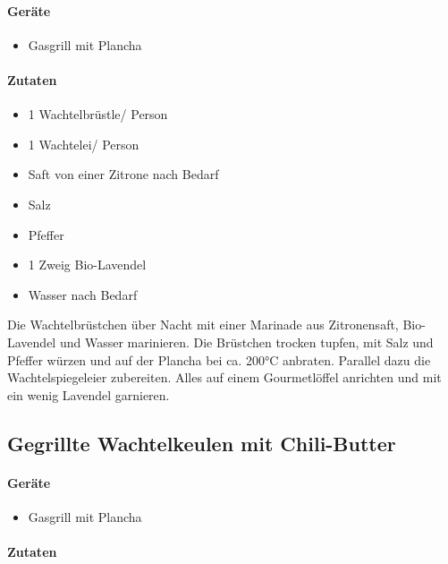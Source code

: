 \paragraph{Geräte}

\begin{itemize}[noitemsep]
	\item Gasgrill mit Plancha
\end{itemize}
	
\paragraph{Zutaten}

\begin{itemize}[noitemsep]
	\item 1 Wachtelbrüstle/ Person
	\item 1 Wachtelei/ Person
	\item Saft von einer Zitrone nach Bedarf
	\item Salz
	\item Pfeffer
	\item 1 Zweig Bio-Lavendel
	\item Wasser nach Bedarf
\end{itemize}

Die Wachtelbrüstchen über Nacht mit einer Marinade aus Zitronensaft, Bio-Lavendel und Wasser marinieren. Die Brüstchen trocken tupfen, mit Salz und Pfeffer würzen und  auf der Plancha bei ca. 200°C anbraten. Parallel dazu die Wachtelspiegeleier zubereiten. Alles auf einem Gourmetlöffel anrichten und mit ein wenig Lavendel garnieren.

\subsection{ Gegrillte Wachtelkeulen mit Chili-Butter }

\paragraph{Geräte}

\begin{itemize}[noitemsep]
	\item Gasgrill mit Plancha
\end{itemize}

\paragraph{Zutaten}

